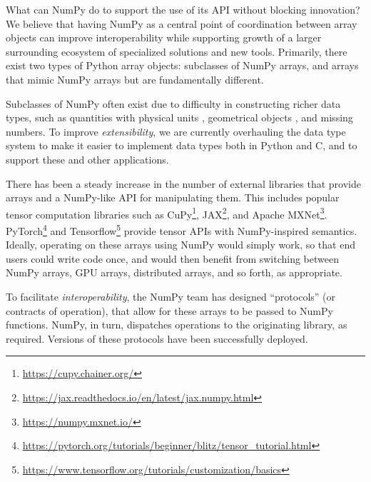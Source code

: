 What can NumPy do to support the use of its API without blocking innovation?
We believe that having NumPy as a central point of coordination between array objects can improve interoperability while
supporting growth of a larger surrounding ecosystem of specialized solutions
and new tools.
Primarily, there exist two types of Python array objects: subclasses of NumPy
arrays, and arrays that mimic NumPy arrays but are fundamentally different.

Subclasses of NumPy often exist due to difficulty in constructing richer data
types, such as quantities with physical units \cite{astropy,Goldbaum2018,pint},
geometrical objects \cite{pygeos}, and missing numbers.
To improve \emph{extensibility}, we are currently overhauling the data type
system to make it easier to implement data types both in Python and C, and to
support these and other applications.

There has been a steady increase in the number of external libraries that
provide arrays and a NumPy-like API for manipulating them.
This includes popular tensor computation libraries such as
CuPy\footnote{\url{https://cupy.chainer.org/}},
JAX\footnote{\url{https://jax.readthedocs.io/en/latest/jax.numpy.html}}, and
Apache MXNet\footnote{\url{https://numpy.mxnet.io/}}.
PyTorch\footnote{\url{https://pytorch.org/tutorials/beginner/blitz/tensor\_tutorial.html}}
and
Tensorflow\footnote{\url{https://www.tensorflow.org/tutorials/customization/basics}}
provide tensor APIs with NumPy-inspired semantics.
Ideally, operating on these arrays using NumPy would simply work, so that end
users could write code once, and would then benefit from switching between
NumPy arrays, GPU arrays, distributed arrays, and so forth, as appropriate.

To facilitate \emph{interoperability}, the NumPy team has designed
``protocols'' (or contracts of operation), that allow for these arrays to be
passed to NumPy functions.
NumPy, in turn, dispatches operations to the originating library, as required.
Versions of these protocols have been successfully deployed.


